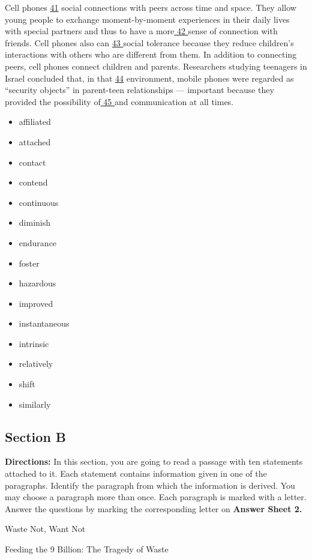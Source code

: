 \documentclass[UTF8,11pt]{ctexart}
\begin{document}
Cell phones \uline{41} social connections with peers across time and space. They allow young people to exchange moment-by-moment experiences in their daily lives with special partners and thus to have a more\uline{ 42 }sense of connection with friends. Cell phones also can \uline{43 }social tolerance because they reduce children’s interactions with others who are different from them. In addition to connecting peers, cell phones connect children and parents. Researchers studying teenagers in Israel concluded that, in that \uline{44} environment, mobile phones were regarded as “security objects” in parent-teen relationships — important because they provided the possibility of\uline{ 45 }and communication at all times.


\begin{itemize}[leftmargin=2em,itemsep=.2em,topsep=.4em]\item[A.] affiliated
\item[B.] attached
\item[C.] contact
\item[D.] contend
\item[E.] continuous
\item[F.] diminish
\item[G.] endurance
\item[H.] foster
\item[I.] hazardous
\item[J.] improved
\item[K.] instantaneous
\item[L.] intrinsic
\item[M.] relatively
\item[N.] shift
\item[O.] similarly
\end{itemize}

\subsection*{\textbf{Section B}}


\textbf{Directions:} In this section, you are going to read a passage with ten statements attached to it. Each statement contains information given in one of the paragraphs. Identify the paragraph from which the information is derived. You may choose a paragraph more than once. Each paragraph is marked with a letter. Answer the questions by marking the corresponding letter on\textbf{ Answer Sheet 2.}


Waste Not, Want Not


Feeding the 9 Billion: The Tragedy of Waste
\end{document}
